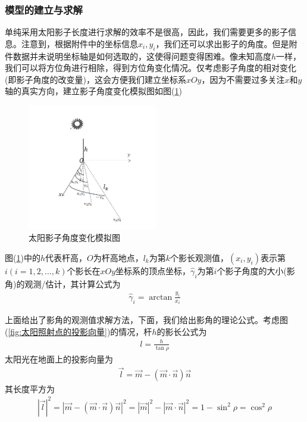         \subsubsection{模型的建立与求解}
            \par
            单纯采用太阳影子长度进行求解的效率不是很高，因此，我们需要更多的影子信息。注意到，根据附件中的坐标信息$x_i,y_i$，我们还可以求出影子的角度。但是附件数据并未说明坐标轴是如何选取的，这使得问题变得困难。像未知高度$h$一样，我们可以将方位角进行相除，得到方位角变化情况。仅考虑影子角度的相对变化(即影子角度的改变量)，这会方便我们建立坐标系$xOy$，因为不需要过多关注$x$和$y$轴的真实方向，建立影子角度变化模拟图如图(\ref{fig:太阳影子角度变化模拟图})
			\begin{figure}[H]
			\centering
			\includegraphics[height=5.5cm]{images/Sun_shadow_angle_change.jpg}
			\caption{太阳影子角度变化模拟图}
			\label{fig:太阳影子角度变化模拟图}
			\end{figure}
            图(\ref{fig:太阳影子角度变化模拟图})中的$h$代表杆高，$O$为杆高地点，$l_k$为第$k$个影长观测值，$(x_i, y_i )$表示第$i(i=1,2,\dots,k)$个影长在$xOy$坐标系的顶点坐标，$\hat{\gamma}_i$为第$i$个影子角度的大小(影角)的观测/估计，其计算公式为
            \begin{align*}
            \hat{\gamma}_i = \arctan\frac{y_i}{x_i}
            \end{align*}
            \par
            上面给出了影角的观测值求解方法，下面，我们给出影角的理论公式。考虑图(\ref{fig:太阳照射点的投影向量})的情况，杆$h$的影长公式为
            \begin{align*}
            l = \frac{h}{\tan\rho}
            \end{align*}
            太阳光在地面上的投影向量为
            \begin{align*}
            \vec{l} = \vec{m} - (\vec{m}\cdot \vec{n})\vec{n}
            \end{align*}
            其长度平方为
            \begin{align*}
            |\vec{l}|^2 = |\vec{m} - (\vec{m}\cdot \vec{n})\vec{n}|^2 = |\vec{m}|^2 - |\vec{m}\cdot\vec{n}|^2 = 1-\sin^2\rho = \cos^2\rho
            \end{align*}
